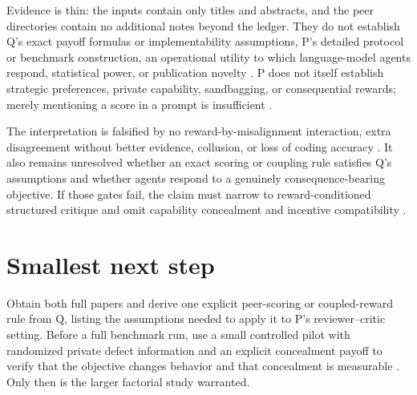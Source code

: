 \documentclass{article}
\begin{document}
Evidence is thin: the inputs contain only titles and abstracts, and the peer directories contain no additional notes beyond the ledger.  They do not establish Q's exact payoff formulas or implementability assumptions, P's detailed protocol or benchmark construction, an operational utility to which language-model agents respond, statistical power, or publication novelty .  P does not itself establish strategic preferences, private capability, sandbagging, or consequential rewards; merely mentioning a score in a prompt is insufficient .

The interpretation is falsified by no reward-by-misalignment interaction, extra disagreement without better evidence, collusion, or loss of coding accuracy .  It also remains unresolved whether an exact scoring or coupling rule satisfies Q's assumptions and whether agents respond to a genuinely consequence-bearing objective.  If those gates fail, the claim must narrow to reward-conditioned structured critique and omit capability concealment and incentive compatibility .

\section{Smallest next step}

Obtain both full papers and derive one explicit peer-scoring or coupled-reward rule from Q, listing the assumptions needed to apply it to P's reviewer--critic setting.  Before a full benchmark run, use a small controlled pilot with randomized private defect information and an explicit concealment payoff to verify that the objective changes behavior and that concealment is measurable .  Only then is the larger factorial study warranted.
\end{document}
